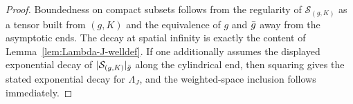 \begin{proof}
Boundedness on compact subsets follows from the regularity of $\mathcal{S}_{(g,K)}$ as a tensor built from $(g,K)$ and the equivalence of $g$ and $\bar{g}$ away from the asymptotic ends. The decay at spatial infinity is exactly the content of Lemma~\ref{lem:Lambda-J-welldef}. If one additionally assumes the displayed exponential decay of $|\mathcal{S}_{(g,K)}|_{\bar{g}}$ along the cylindrical end, then squaring gives the stated exponential decay for $\Lambda_J$, and the weighted-space inclusion follows immediately.
\end{proof}


